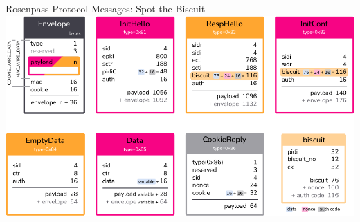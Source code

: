 \begin{frame}{Rosenpass Protocol Messages: Spot the Biscuit}
\centering
    \includegraphics[height=\extendedframetextheight]{graphics/rp-messages-04-all-rgb.pdf}
\end{frame}

